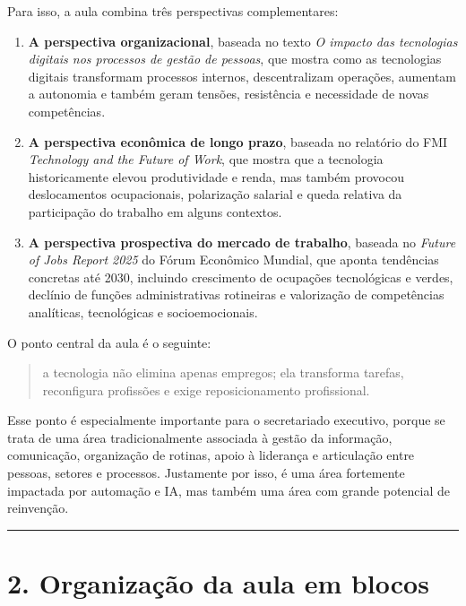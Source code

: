 \documentclass[
]{book}
\providecommand{\tightlist}{%
  \setlength{\itemsep}{0pt}\setlength{\parskip}{0pt}}
\theoremstyle{definition}
\theoremstyle{definition}
\theoremstyle{definition}
\theoremstyle{definition}
\theoremstyle{remark}
\begin{document}
Para isso, a aula combina três perspectivas complementares:

\begin{enumerate}
\def\labelenumi{\arabic{enumi}.}
\tightlist
\item
  \textbf{A perspectiva organizacional}, baseada no texto \emph{O impacto das tecnologias digitais nos processos de gestão de pessoas}, que mostra como as tecnologias digitais transformam processos internos, descentralizam operações, aumentam a autonomia e também geram tensões, resistência e necessidade de novas competências.
\item
  \textbf{A perspectiva econômica de longo prazo}, baseada no relatório do FMI \emph{Technology and the Future of Work}, que mostra que a tecnologia historicamente elevou produtividade e renda, mas também provocou deslocamentos ocupacionais, polarização salarial e queda relativa da participação do trabalho em alguns contextos.
\item
  \textbf{A perspectiva prospectiva do mercado de trabalho}, baseada no \emph{Future of Jobs Report 2025} do Fórum Econômico Mundial, que aponta tendências concretas até 2030, incluindo crescimento de ocupações tecnológicas e verdes, declínio de funções administrativas rotineiras e valorização de competências analíticas, tecnológicas e socioemocionais.
\end{enumerate}

O ponto central da aula é o seguinte:

\begin{quote}
a tecnologia não elimina apenas empregos; ela transforma tarefas, reconfigura profissões e exige reposicionamento profissional.
\end{quote}

Esse ponto é especialmente importante para o secretariado executivo, porque se trata de uma área tradicionalmente associada à gestão da informação, comunicação, organização de rotinas, apoio à liderança e articulação entre pessoas, setores e processos. Justamente por isso, é uma área fortemente impactada por automação e IA, mas também uma área com grande potencial de reinvenção.

\begin{center}\rule{0.5\linewidth}{0.5pt}\end{center}

\chapter{2. Organização da aula em blocos}\label{organizauxe7uxe3o-da-aula-em-blocos}
\end{document}
